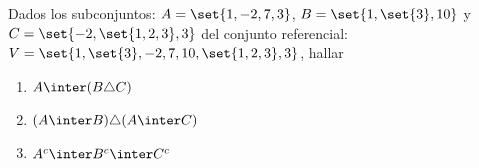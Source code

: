 \begin{enunciado}{\ejercicio}
Dados los subconjuntos: $A = \set{1, -2, 7, 3}$, $B = \set{1, \set{3}, 10}$ y $C = \set{-2,\set{1,2,3},3}$
del conjunto referencial: $V = \set{1,\set{3}, -2,7, 10, \set{1,2,3},3}$, hallar

\begin{multicols}{3}
	\begin{enumerate}[label=(\roman*)]
		\item $A \inter (B \triangle C)$
		\item $(A \inter B) \triangle (A \inter C)$
		\item $A^c \inter B^c \inter C^c$
	\end{enumerate}
\end{multicols}
\end{enunciado}
\hacer
